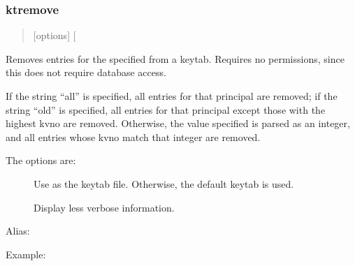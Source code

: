 \documentclass[letterpaper,10pt,english]{sphinxmanual}
\begin{document}
\subsubsection{ktremove}
\label{\detokenize{admin/admin_commands/kadmin_local:id18}}\label{\detokenize{admin/admin_commands/kadmin_local:ktremove}}\label{\detokenize{admin/admin_commands/kadmin_local:ktadd-end}}\begin{quote}

 {[}options{]}  {[} \textbar{}  \textbar{} \sphinxstyleemphasis{old}{]}
\end{quote}

Removes entries for the specified  from a keytab.  Requires
no permissions, since this does not require database access.

If the string “all” is specified, all entries for that principal are
removed; if the string “old” is specified, all entries for that
principal except those with the highest kvno are removed.  Otherwise,
the value specified is parsed as an integer, and all entries whose
kvno match that integer are removed.

The options are:
\begin{description}
\item[{ }] \leavevmode
Use  as the keytab file.  Otherwise, the default keytab is
used.

\item[{}] \leavevmode
Display less verbose information.

\end{description}

Alias: 

Example:

%
\begin{sphinxVerbatim}[commandchars=\\\{\}]
   
         
\end{sphinxVerbatim}
\end{document}
